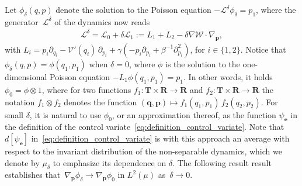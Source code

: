 \documentclass[11pt,a4paper]{article}
\newcommand{\real}{\mathbf R}
\newcommand{\torus}{\mathbf T}
\newcommand{\grad}{\nabla}
\newcommand{\vect}[1]{\boldsymbol{\mathbf #1}}
\renewcommand{\d}{\mathrm d}
\theoremstyle{plain}
\numberwithin{equation}{section}
\begin{document}
Let $\phi_\delta(q, p)$ denote the solution to the Poisson equation $- \mathcal L^{\delta} \phi_\delta = p_1$,
where the generator~$\mathcal L^{\delta}$ of the dynamics now reads
\begin{align}
    \label{eq:generator}
    \mathcal L^{\delta} = \mathcal L_0 + \delta \mathcal L_1
    := L_1 + L_2
    - \delta \grad \mathcal W \cdot \grad_{\vect p},
\end{align}
with $L_i = p_i \partial_{q_i} - \mathcal V'(q_i) \, \partial_{p_i} + \gamma \left(- p_i \partial_{p_i} + \beta^{-1} \partial^2_{p_i} \right)$,
for $i \in \{1, 2\}$.
Notice that $\phi_\delta(q, p) = \phi(q_1, p_1)$ when $\delta = 0$,
where $\phi$ is the solution to the one-dimensional Poisson equation $-L_1 \phi(q_1, p_1) = p_1$.
In other words, it holds $\phi_0 = \phi \otimes 1$,
where for two functions $f_1: \torus \times \real \rightarrow \real$ and $f_2: \torus \times \real \rightarrow \real$
the notation $f_1 \otimes f_2$ denotes the function $(\vect q, \vect p) \mapsto f_1(q_1,p_1) \, f_2(q_2,p_2)$.
For small $\delta$, it is natural to use $\phi_0$, or an approximation thereof,
as the function $\psi_{\vect e}$ in the definition of the control variate~\eqref{eq:definition_control_variate}.
Note that $d[\psi_{\vect e}]$ in~\eqref{eq:definition_control_variate} is with this approach an average with respect to the invariant distribution of the non-separable dynamics,
which we denote by $\mu_{\delta}$ to emphasize its dependence on $\delta$.
The following result result establishes that~$\grad_{\vect p} \phi_\delta \to \grad_{\vect p} \phi_0$ in $L^2(\mu)$ as~$\delta \to 0$.
\end{document}
